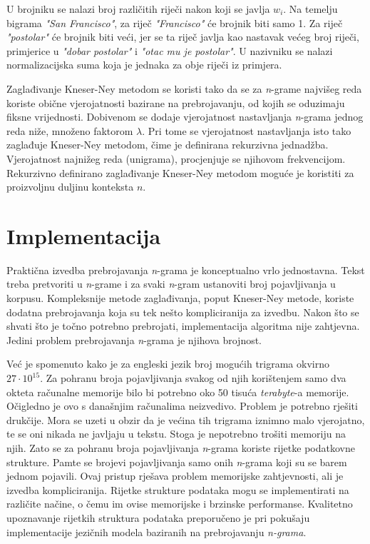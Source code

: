 \documentclass[times, utf8, diplomski, numeric]{fer}
\begin{document}
U brojniku se nalazi broj različitih riječi nakon koji se javlja $w_i$. Na temelju bigrama \textit{"San Francisco"}, za riječ \textit{"Francisco"} će brojnik biti samo 1. Za riječ \textit{"postolar"} će brojnik biti veći, jer se ta riječ javlja kao nastavak većeg broj riječi, primjerice u \textit{"dobar postolar"} i \textit{"otac mu je postolar"}. U nazivniku se nalazi normalizacijska suma koja je jednaka za obje riječi iz primjera.

Zaglađivanje Kneser-Ney metodom se koristi tako da se za \textit{n}-grame najvišeg reda koriste obične vjerojatnosti bazirane na prebrojavanju, od kojih se oduzimaju fiksne vrijednosti. Dobivenom se dodaje vjerojatnost nastavljanja \textit{n}-grama jednog reda niže, množeno faktorom $\lambda$. Pri tome se vjerojatnost nastavljanja isto tako zaglađuje Kneser-Ney metodom, čime je definirana rekurzivna jednadžba. Vjerojatnost najnižeg reda (unigrama), procjenjuje se njihovom frekvencijom. Rekurzivno definirano zaglađivanje Kneser-Ney metodom moguće je koristiti za proizvoljnu duljinu konteksta $n$.

\section{Implementacija}

Praktična izvedba prebrojavanja \textit{n}-grama je konceptualno vrlo jednostavna. Tekst treba pretvoriti u \textit{n}-grame i za svaki \textit{n}-gram ustanoviti broj pojavljivanja u korpusu. Kompleksnije metode zaglađivanja, poput Kneser-Ney metode, koriste dodatna prebrojavanja koja su tek nešto kompliciranija za izvedbu. Nakon što se shvati što je točno potrebno prebrojati, implementacija algoritma nije zahtjevna. Jedini problem prebrojavanja \textit{n}-grama je njihova brojnost.

Već je spomenuto kako je za engleski jezik broj mogućih trigrama okvirno $27 \cdot 10^{15}$. Za pohranu broja pojavljivanja svakog od njih korištenjem samo dva okteta računalne memorije bilo bi potrebno oko 50 tisuća \textit{terabyte}-a memorije. Očigledno je ovo s današnjim računalima neizvedivo. Problem je potrebno rješiti drukčije. Mora se uzeti u obzir da je većina tih trigrama iznimno malo vjerojatno, te se oni nikada ne javljaju u tekstu. Stoga je nepotrebno trošiti memoriju na njih. Zato se za pohranu broja pojavljivanja \textit{n}-grama koriste rijetke  podatkovne strukture. Pamte se brojevi pojavljivanja samo onih \textit{n}-grama koji su se barem jednom pojavili. Ovaj pristup rješava problem memorijske zahtjevnosti, ali je izvedba kompliciranija. Rijetke strukture podataka mogu se implementirati na različite načine, o čemu im ovise memorijske i brzinske performanse. Kvalitetno upoznavanje rijetkih struktura podataka preporučeno je pri pokušaju implementacije jezičnih modela baziranih na prebrojavanju \textit{n-grama}.
\end{document}
